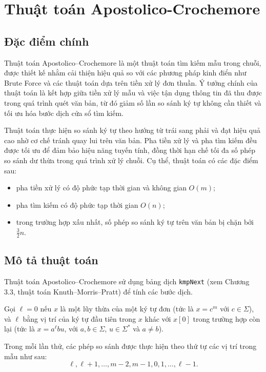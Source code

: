 \section{Thuật toán Apostolico-Crochemore}

\subsection{Đặc điểm chính}

Thuật toán Apostolico–Crochemore là một thuật toán tìm kiếm mẫu trong chuỗi, được thiết kế nhằm cải thiện hiệu quả so với các 
phương pháp kinh điển như Brute Force và các thuật toán dựa trên tiền xử lý đơn thuần. 
Ý tưởng chính của thuật toán là kết hợp giữa tiền xử lý mẫu và việc tận dụng thông tin đã thu được trong quá trình quét văn bản, từ đó giảm số lần so sánh ký tự không cần thiết và tối ưu hóa bước dịch cửa sổ tìm kiếm.

Thuật toán thực hiện so sánh ký tự theo hướng từ trái sang phải và đạt hiệu quả cao nhờ cơ chế tránh quay lui trên văn bản. 
Pha tiền xử lý và pha tìm kiếm đều được tối ưu để đảm bảo hiệu năng tuyến tính, 
đồng thời hạn chế tối đa số phép so sánh dư thừa trong quá trình xử lý chuỗi. Cụ thể, thuật toán có các đặc điểm sau:

\begin{itemize}
    \item pha tiền xử lý có độ phức tạp thời gian và không gian $O(m)$;
    \item pha tìm kiếm có độ phức tạp thời gian $O(n)$;
    \item trong trường hợp xấu nhất, số phép so sánh ký tự trên văn bản bị chặn bởi $\frac{3}{2}n$.
\end{itemize}

\subsection{Mô tả thuật toán}

Thuật toán Apostolico–Crochemore sử dụng bảng dịch \texttt{kmpNext} (xem Chương 3.3, thuật toán Knuth–Morris–Pratt) 
để tính các bước dịch.

Gọi $\ell = 0$ nếu $x$ là một lũy thừa của một ký tự đơn (tức là $x = c^m$ với $c \in \Sigma$), và $\ell$ 
bằng vị trí của ký tự đầu tiên trong $x$ khác với $x[0]$ 
trong trường hợp còn lại (tức là $x = a^\ell bu$, với $a, b \in \Sigma$, $u \in \Sigma^*$ và $a \neq b$).

Trong mỗi lần thử, các phép so sánh được thực hiện theo thứ tự các vị trí trong mẫu như sau:
\[
\ell, \ell+1, \ldots, m-2, m-1, 0, 1, \ldots, \ell-1.
\]

